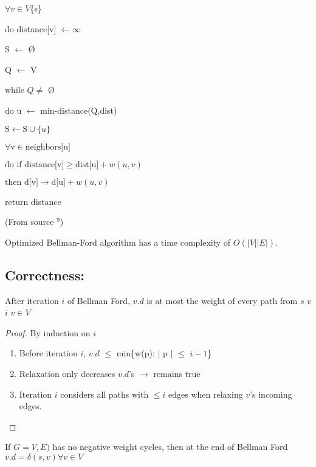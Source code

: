 \documentclass{article}
\begin{document}
$\forall v \in V$\textemdash\{s\}

\hspace{5 pt} do distance[v] $\leftarrow \infty$

S $\leftarrow$ \O

Q $\leftarrow$ V

while $Q \neq$ \O

do u $\leftarrow$ min-distance(Q,dist)

\hspace{5 pt} $\text{S} \leftarrow \text{S} \cup \{u\}$

\hspace{5 pt}\hspace{5 pt} $\forall \text{v} \in \text{neighbors[u]}$

\hspace{5 pt}\hspace{5 pt}\hspace{5 pt} $\text{do if distance[v]} \geq \text{dist[u]} + w(u,v)$

\hspace{5 pt}\hspace{5 pt}\hspace{5 pt}\hspace{5 pt} $\text{then d[v]} \rightarrow \text{d[u]} + w(u, v)$

return distance

(From source $^9$)

Optimized Bellman-Ford algorithm has a time complexity of $O(|V||E|)$.

\subsection{Correctness:}
After iteration $i$ of Bellman Ford, $v.d$ is at most the weight of every path from  $s$  $v$  $i$  $v \in V$
\begin{proof}
By induction on $i$
\begin{enumerate}
\item Before iteration $i$, $v.d$ $\leq$ min\{w(p):\hspace{1 pt} $\mid$ p $\mid$ $\leq$ $i-1$\} 

\item Relaxation only decreases $v.d$'s $\rightarrow$ remains true

\item Iteration $i$ considers all paths with $\leq i$ edges when relaxing
$v$'s incoming edges.
\end{enumerate}
\end{proof}
If $G=V,E)$ has no negative weight cycles, then at the end of Bellman Ford $v.d = \delta(s,v) \forall v \in V$
\end{document}
